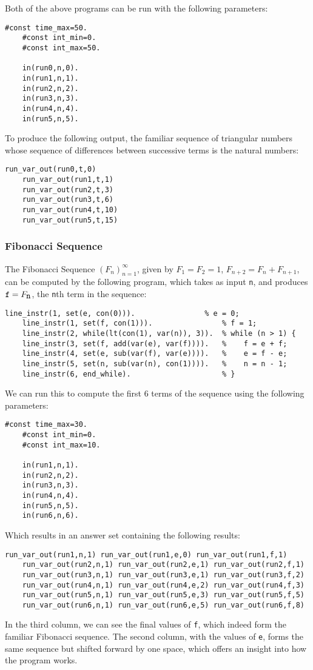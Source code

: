 \documentclass[a4paper,twoside,notitlepage]{report}
\begin{document}
Both of the above programs can be run with the following parameters:
\begin{Verbatim}[samepage=true]
    #const time_max=50.
    #const int_min=0.
    #const int_max=50.
    
    in(run0,n,0).
    in(run1,n,1).
    in(run2,n,2).
    in(run3,n,3).
    in(run4,n,4).
    in(run5,n,5).
\end{Verbatim}

To produce the following output, the familiar sequence of triangular 
numbers whose sequence of differences between successive terms is the 
natural numbers:
\begin{Verbatim}[samepage=true]
    run_var_out(run0,t,0)
    run_var_out(run1,t,1)
    run_var_out(run2,t,3)
    run_var_out(run3,t,6)
    run_var_out(run4,t,10)
    run_var_out(run5,t,15)
\end{Verbatim}

\subsubsection{Fibonacci Sequence}
The Fibonacci Sequence $(F_n)_{n=1}^\infty$, given by $F_1=F_2=1$, 
$F_{n+2}=F_{n}+F_{n+1}$, can be computed by the following program, which 
takes as input \verb|n|, and produces $\verb|f|=F_{\verb|n|}$, the 
\verb|n|th term in the sequence:
\begin{Verbatim}[samepage=true]
    line_instr(1, set(e, con(0))).                % e = 0;
    line_instr(1, set(f, con(1))).                % f = 1;
    line_instr(2, while(lt(con(1), var(n)), 3)).  % while (n > 1) {
    line_instr(3, set(f, add(var(e), var(f)))).   %    f = e + f;
    line_instr(4, set(e, sub(var(f), var(e)))).   %    e = f - e;
    line_instr(5, set(n, sub(var(n), con(1)))).   %    n = n - 1;
    line_instr(6, end_while).                     % }
\end{Verbatim}

We can run this to compute the first 6 terms of the sequence using the 
following parameters:
\begin{Verbatim}[samepage=true]
    #const time_max=30.
    #const int_min=0.
    #const int_max=10.
    
    in(run1,n,1).
    in(run2,n,2).
    in(run3,n,3).
    in(run4,n,4).
    in(run5,n,5).
    in(run6,n,6).
\end{Verbatim}

Which results in an answer set containing the following results:
\begin{Verbatim}[samepage=true]
    run_var_out(run1,n,1) run_var_out(run1,e,0) run_var_out(run1,f,1)
    run_var_out(run2,n,1) run_var_out(run2,e,1) run_var_out(run2,f,1) 
    run_var_out(run3,n,1) run_var_out(run3,e,1) run_var_out(run3,f,2)
    run_var_out(run4,n,1) run_var_out(run4,e,2) run_var_out(run4,f,3)
    run_var_out(run5,n,1) run_var_out(run5,e,3) run_var_out(run5,f,5)
    run_var_out(run6,n,1) run_var_out(run6,e,5) run_var_out(run6,f,8)
\end{Verbatim}
In the third column, we can see the final values of \verb|f|, which indeed 
form the familiar Fibonacci sequence. The second column, with the values 
of \verb|e|, forms the same sequence but shifted forward by one space, 
which offers an insight into how the program works.
\end{document}
